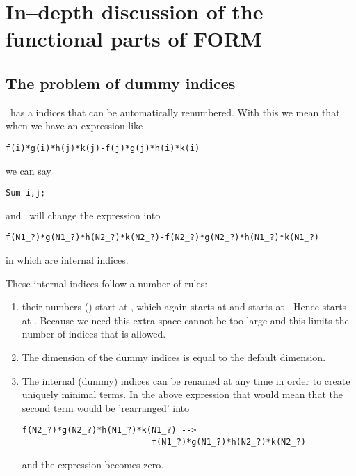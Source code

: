 \section{In--depth discussion of the functional parts of FORM}
\label{sec:indepth}


\subsection{The problem of dummy indices}

\FORM\ has a indices that can be automatically renumbered. With this we mean 
that when we have an expression like

\begin{verbatim}
f(i)*g(i)*h(j)*k(j)-f(j)*g(j)*h(i)*k(i)
\end{verbatim}

we can say

\begin{verbatim}
Sum i,j;
\end{verbatim}

and \FORM\ will change the expression into

\begin{verbatim}
f(N1_?)*g(N1_?)*h(N2_?)*k(N2_?)-f(N2_?)*g(N2_?)*h(N1_?)*k(N1_?)
\end{verbatim}

in which  are internal indices.

These internal indices follow a number of rules:
\begin{enumerate}
\item
   their numbers () start at , which again starts at 
    and  starts at .
   Hence  starts at .
   Because we need this extra space  cannot be too large and this 
   limits the number of indices that is allowed.
\item The dimension of the dummy indices is equal to the default dimension.
\item The internal (dummy) indices can be renamed at any time in order to 
   create uniquely minimal terms. In the above expression that would mean 
   that the second term would be 'rearranged' into
\begin{verbatim}
f(N2_?)*g(N2_?)*h(N1_?)*k(N1_?) -->
                          f(N1_?)*g(N1_?)*h(N2_?)*k(N2_?)
\end{verbatim}
   and the expression becomes zero.
\end{enumerate}


